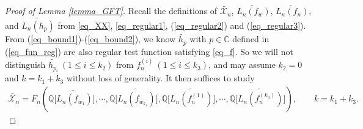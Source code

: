 \documentclass[10pt,reqno]{amsart}
\numberwithin{equation}{section}
\numberwithin{figure}{section}
\theoremstyle{plain}
\newcommand{\C}{{\mathbb{C}}}
\newcommand{\wt}{\widetilde}
\newcommand{\<}{\langle}
\renewcommand{\>}{\rangle}
\begin{document}
\begin{proof}[Proof of Lemma \ref{lemma_GFT}]
	
Recall the definitions of $\wt{\mathcal{X}_n}$, $\wt{L_n(f_{w})}$, $\wt{L_n(f_n)}$, and $\wt{L_n(h_{p})}$ from \eqref{eq_XX}, \eqref{eq_regular1}, (\ref{eq_regular2}) and (\ref{eq_regular3}). From (\ref{eq_bound1})-(\ref{eq_bound2}), we know $\wt{h_{p}}$ with $p \in \overline{\C}$ defined in (\ref{eq_fun_reg}) are also regular test function satisfying \eqref{eq_f}. So we will not distinguish $\wt{h_{p_i}}~(1\leq i\leq k_2)$ from $f^{(i)}_n~(1\leq i\leq k_3)$, and may assume $k_2=0$ and $k=k_1+k_3$ without loss of generality. It then suffices to study	\begin{align}\label{eq_cf}
\wt{\mathcal{X}_n}=F_n\left(\mathbb{Q}\big[\wt{L_n(f_{w_1})}\big], \cdots , \mathbb{Q}\big[\wt{L_n(f_{w_{k_1}})}\big],\mathbb{Q}\big[\wt{L_n(f_n^{(1)})}\big],\cdots, \mathbb{Q}\big[\wt{L_n(f_n^{(k_3)})}\big] \right), \qquad k=k_1+k_3.
\end{align}
	
	
	

\end{proof}
\end{document}
